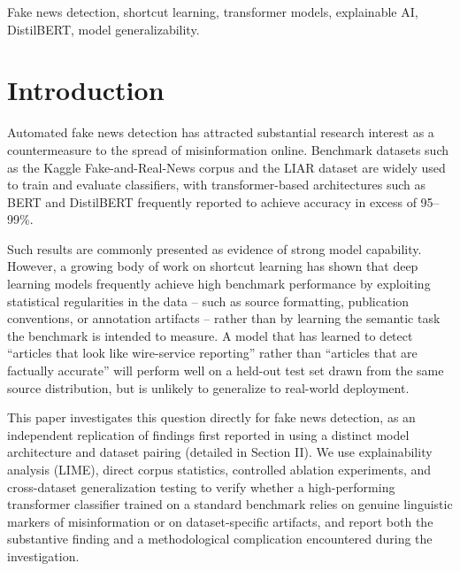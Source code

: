 \documentclass[conference]{IEEEtran}
\begin{document}
\begin{abstract}
clean. This work contributes a replication of documented shortcut-learning behavior in fake news detection across two model families, with controls ruling out length confounding and single-seed noise as alternative explanations, and demonstrates verification practices for distinguishing genuine findings from pipeline artifacts.
\end{abstract}

\begin{IEEEkeywords}
Fake news detection, shortcut learning, transformer models, explainable AI, DistilBERT, model generalizability.
\end{IEEEkeywords}

\section{Introduction}
Automated fake news detection has attracted substantial research interest as a countermeasure to the spread of misinformation online. Benchmark datasets such as the Kaggle Fake-and-Real-News corpus and the LIAR dataset \cite{wang2017} are widely used to train and evaluate classifiers, with transformer-based architectures such as BERT and DistilBERT frequently reported to achieve accuracy in excess of 95--99\%.

Such results are commonly presented as evidence of strong model capability. However, a growing body of work on shortcut learning \cite{geirhos2020} has shown that deep learning models frequently achieve high benchmark performance by exploiting statistical regularities in the data -- such as source formatting, publication conventions, or annotation artifacts -- rather than by learning the semantic task the benchmark is intended to measure. A model that has learned to detect ``articles that look like wire-service reporting'' rather than ``articles that are factually accurate'' will perform well on a held-out test set drawn from the same source distribution, but is unlikely to generalize to real-world deployment.

This paper investigates this question directly for fake news detection, as an independent replication of findings first reported in \cite{hoy2022} using a distinct model architecture and dataset pairing (detailed in Section II). We use explainability analysis (LIME), direct corpus statistics, controlled ablation experiments, and cross-dataset generalization testing to verify whether a high-performing transformer classifier trained on a standard benchmark relies on genuine linguistic markers of misinformation or on dataset-specific artifacts, and report both the substantive finding and a methodological complication encountered during the investigation.
\end{document}
